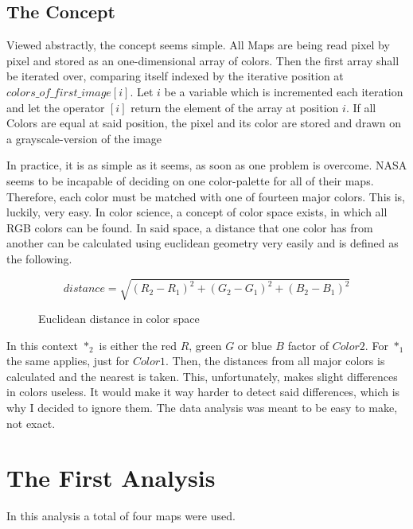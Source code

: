 \documentclass{article}
\begin{document}
\begin{multicols}{3}
\section{The Concept}

Viewed abstractly, the concept seems simple.
All Maps are being read pixel by pixel and stored as an one-dimensional array of colors.
Then the first array shall be iterated over, comparing itself indexed by the iterative position at \(colors\_of\_first\_image[i]\).
Let \(i\) be a variable which is incremented each iteration and let the operator \([i]\) return the element of the array at position \(i\).
If all Colors are equal at said position, the pixel and its color are stored and drawn on a grayscale-version of the image

In practice, it is as simple as it seems, as soon as one problem is overcome.
NASA seems to be incapable of deciding on one color-palette for all of their maps.
Therefore, each color must be matched with one of fourteen major colors.
This is, luckily, very easy.
In color science, a concept of color space exists, in which all RGB colors can be found.
In said space, a distance that one color has from another can be calculated using euclidean geometry very easily and is defined as the following.

\end{multicols}
\begin{figure}[H]
\[distance = \sqrt{(R_2 - R_1)^2 + (G_2 - G_1)^2 + (B_2 - B_1)^2}\]
\caption{Euclidean distance in color space}
\end{figure}
\begin{multicols}{3}
In this context \(*_2\) is either the red \(R\), green \(G\) or blue \(B\) factor of \(Color 2\).
For \(*_1\) the same applies, just for \(Color 1\). 
Then, the distances from all major colors is calculated and the nearest is taken.
This, unfortunately, makes slight differences in colors useless.
It would make it way harder to detect said differences, which is why I decided to ignore them. The data analysis was meant to be easy to make, not exact.

\section{The First Analysis}
In this analysis a total of four maps were used.

\end{multicols}
\end{document}
